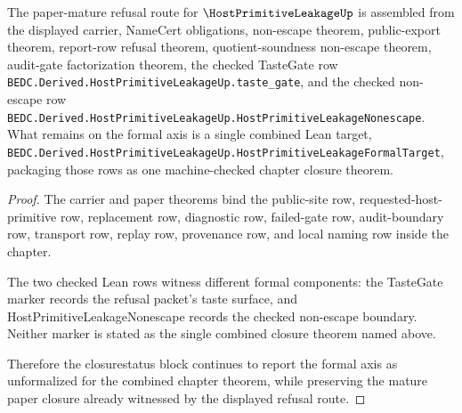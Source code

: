 \begin{theorem}
\label{thm:host-primitive-leakage-formal-axis-boundary}
The paper-mature refusal route for $\HostPrimitiveLeakageUp$ is assembled from the displayed carrier, NameCert obligations, non-escape theorem, public-export theorem, report-row refusal theorem, quotient-soundness non-escape theorem, audit-gate factorization theorem, the checked TasteGate row \texttt{BEDC.Derived.HostPrimitiveLeakageUp.taste\_gate}, and the checked non-escape row \texttt{BEDC.Derived.HostPrimitiveLeakageUp.HostPrimitiveLeakageNonescape}. What remains on the formal axis is a single combined Lean target, \texttt{BEDC.Derived.HostPrimitiveLeakageUp.HostPrimitiveLeakageFormalTarget}, packaging those rows as one machine-checked chapter closure theorem.
\end{theorem}
\begin{proof}
The carrier and paper theorems bind the public-site row, requested-host-primitive row, replacement row, diagnostic row, failed-gate row, audit-boundary row, transport row, replay row, provenance row, and local naming row inside the chapter.

The two checked Lean rows witness different formal components: the TasteGate marker records the refusal packet's taste surface, and HostPrimitiveLeakageNonescape records the checked non-escape boundary. Neither marker is stated as the single combined closure theorem named above.

Therefore the closurestatus block continues to report the formal axis as unformalized for the combined chapter theorem, while preserving the mature paper closure already witnessed by the displayed refusal route.
\end{proof}

